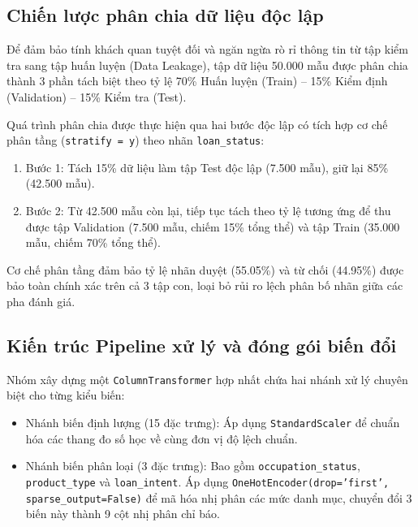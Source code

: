 \documentclass[12pt,a4paper,oneside]{report}
\begin{document}
\subsection{Chiến lược phân chia dữ liệu độc lập}
Để đảm bảo tính khách quan tuyệt đối và ngăn ngừa rò rỉ thông tin từ tập kiểm tra sang tập huấn luyện (Data Leakage), tập dữ liệu 50.000 mẫu được phân chia thành 3 phần tách biệt theo tỷ lệ 70\% Huấn luyện (Train) -- 15\% Kiểm định (Validation) -- 15\% Kiểm tra (Test).

Quá trình phân chia được thực hiện qua hai bước độc lập có tích hợp cơ chế phân tầng (\texttt{stratify = y}) theo nhãn \texttt{loan\_status}:
\begin{enumerate}
    \item Bước 1: Tách 15\% dữ liệu làm tập Test độc lập (7.500 mẫu), giữ lại 85\% (42.500 mẫu).
    \item Bước 2: Từ 42.500 mẫu còn lại, tiếp tục tách theo tỷ lệ tương ứng để thu được tập Validation (7.500 mẫu, chiếm 15\% tổng thể) và tập Train (35.000 mẫu, chiếm 70\% tổng thể).
\end{enumerate}

Cơ chế phân tầng đảm bảo tỷ lệ nhãn duyệt (55.05\%) và từ chối (44.95\%) được bảo toàn chính xác trên cả 3 tập con, loại bỏ rủi ro lệch phân bố nhãn giữa các pha đánh giá.

\subsection{Kiến trúc Pipeline xử lý và đóng gói biến đổi}
Nhóm xây dựng một \texttt{ColumnTransformer} hợp nhất chứa hai nhánh xử lý chuyên biệt cho từng kiểu biến:
\begin{itemize}
    \item Nhánh biến định lượng (15 đặc trưng): Áp dụng \texttt{StandardScaler} để chuẩn hóa các thang đo số học về cùng đơn vị độ lệch chuẩn.
    \item Nhánh biến phân loại (3 đặc trưng): Bao gồm \texttt{occupation\_status}, \texttt{product\_type} và \texttt{loan\_intent}. Áp dụng \texttt{OneHotEncoder(drop='first', sparse\_output=False)} để mã hóa nhị phân các mức danh mục, chuyển đổi 3 biến này thành 9 cột nhị phân chỉ báo.
\end{itemize}
\end{document}
